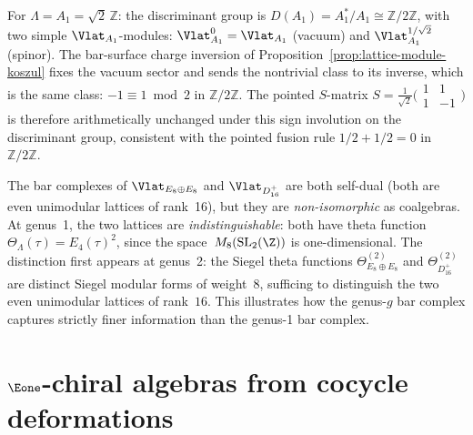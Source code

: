 \begin{example}
\label{ex:lattice-module-A1}
For $\Lambda = A_1 = \sqrt{2}\,\mathbb{Z}$:
the discriminant group is $D(A_1) = A_1^*/A_1 \cong \mathbb{Z}/2\mathbb{Z}$,
with two simple $\Vlat_{A_1}$-modules:
$\Vlat_{A_1}^0 = \Vlat_{A_1}$ (vacuum) and
$\Vlat_{A_1}^{1/\sqrt{2}}$ (spinor). The bar-surface charge inversion
of Proposition~\ref{prop:lattice-module-koszul} fixes the vacuum sector
and sends the nontrivial class to its inverse, which is the same class:
$-1 \equiv 1 \bmod 2$ in $\mathbb{Z}/2\mathbb{Z}$. The pointed
$S$-matrix
$S = \frac{1}{\sqrt{2}}\bigl(\begin{smallmatrix}1 & 1 \\
1 & -1\end{smallmatrix}\bigr)$
is therefore arithmetically unchanged under this sign involution on the
discriminant group, consistent with the pointed fusion rule
$1/2+1/2=0$ in~$\mathbb{Z}/2\mathbb{Z}$.
\end{example}

\begin{remark}
The bar complexes of $\Vlat_{E_8 \oplus E_8}$ and $\Vlat_{D_{16}^+}$ are both self-dual (both are even unimodular lattices of rank~16), but they are \emph{non-isomorphic} as coalgebras. At genus~1, the two lattices are \emph{indistinguishable}: both have theta function $\Theta_\Lambda(\tau) = E_4(\tau)^2$, since the space~$M_8(\mathrm{SL}_2(\Z))$ is one-dimensional. The distinction first appears at genus~2: the Siegel theta functions $\Theta^{(2)}_{E_8 \oplus E_8}$ and $\Theta^{(2)}_{D_{16}^+}$ are distinct Siegel modular forms of weight~8, sufficing to distinguish the two even unimodular lattices of rank~$16$. This illustrates how the genus-$g$ bar complex captures strictly finer information than the genus-1 bar complex.
\end{remark}



\section{$\Eone$-chiral algebras from cocycle deformations}
\label{sec:lattice:e1-families}

